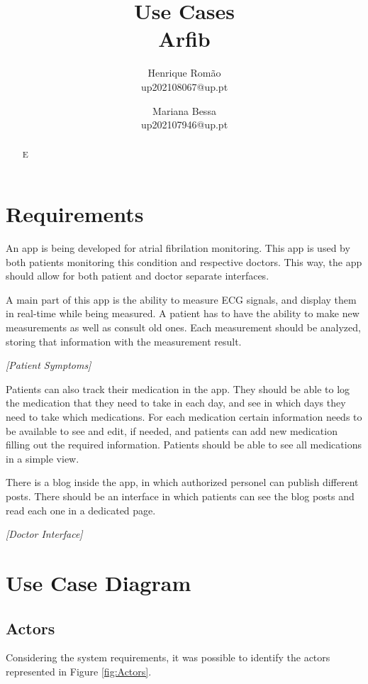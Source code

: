 \documentclass{report}
\title{\Huge \textbf{Use Cases}\\ \huge Arfib}
\author{
    Henrique Romão \\ up202108067@up.pt
    \and
    Mariana Bessa \\ up202107946@up.pt
}
\begin{document}
\maketitle

\begin{abstract}
    E
\end{abstract}

\tableofcontents

\chapter{Requirements}
An app is being developed for atrial fibrilation monitoring.
This app is used by both patients monitoring this condition and respective doctors. 
This way, the app should allow for both patient and doctor separate interfaces.

A main part of this app is the ability to measure ECG signals, and display them in real-time while being measured.
A patient has to have the ability to make new measurements as well as consult old ones.
Each measurement should be analyzed, storing that information with the measurement result.

\textit{[Patient Symptoms]}

Patients can also track their medication in the app.
They should be able to log the medication that they need to take in each day, and see in which days they need to take which medications.
For each medication certain information needs to be available to see and edit, if needed, and patients can add new medication filling out the required information.
Patients should be able to see all medications in a simple view.

There is a blog inside the app, in which authorized personel can publish different posts.
There should be an interface in which patients can see the blog posts and read each one in a dedicated page.

\textit{[Doctor Interface]}


\newpage
\chapter{Use Case Diagram}

\section{Actors}
Considering the system requirements, it was possible to identify the actors represented in Figure \ref{fig:Actors}.
\end{document}
